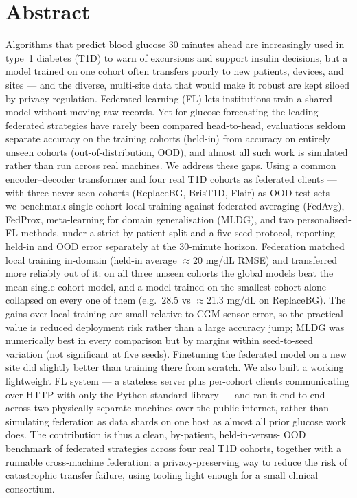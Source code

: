 \documentclass[10pt,letterpaper]{article}
\begin{document}
\section*{Abstract}
Algorithms that predict blood glucose 30 minutes ahead are increasingly used in
type~1 diabetes (T1D) to warn of excursions and support insulin decisions, but a
model trained on one cohort often transfers poorly to new patients, devices, and
sites --- and the diverse, multi-site data that would make it robust are kept
siloed by privacy regulation. Federated learning (FL) lets institutions train a
shared model without moving raw records. Yet for glucose forecasting the leading
federated strategies have rarely been compared head-to-head, evaluations seldom
separate accuracy on the training cohorts (held-in) from accuracy on entirely
unseen cohorts (out-of-distribution, OOD), and almost all such work is simulated
rather than run across real machines. We address these gaps. Using a common
encoder--decoder transformer and four real T1D cohorts as federated clients ---
with three never-seen cohorts (ReplaceBG, BrisT1D, Flair) as OOD test sets --- we
benchmark
single-cohort local training against federated averaging (FedAvg), FedProx,
meta-learning for domain generalisation (MLDG), and two personalised-FL methods,
under a strict by-patient split and a five-seed protocol, reporting held-in and
OOD error separately at the 30-minute horizon. Federation matched local training
in-domain (held-in average $\approx$20 mg/dL RMSE) and transferred more reliably
out of it: on all three unseen cohorts the global models beat the mean
single-cohort model, and a model trained on the smallest
cohort alone collapsed on every one of them (e.g.\ $28.5$ vs $\approx$21.3 mg/dL
on ReplaceBG). The gains over local training are small relative to CGM sensor
error, so the practical value is reduced deployment risk rather than a large
accuracy jump; MLDG was numerically best in every comparison but by margins
within seed-to-seed variation (not significant at five seeds). Finetuning the federated model on a new site
did slightly better than training there from scratch. We also built a working
lightweight FL system --- a stateless server plus per-cohort clients
communicating over HTTP with only the Python standard library --- and ran it
end-to-end across two physically separate machines over the public internet,
rather than simulating federation as data shards on one host as almost all prior
glucose work does. The contribution is thus a clean, by-patient, held-in-versus-
OOD benchmark of federated strategies across four real T1D cohorts, together with
a runnable cross-machine federation: a privacy-preserving way to reduce the risk
of catastrophic transfer failure, using tooling light enough for a small clinical
consortium.
\end{document}
